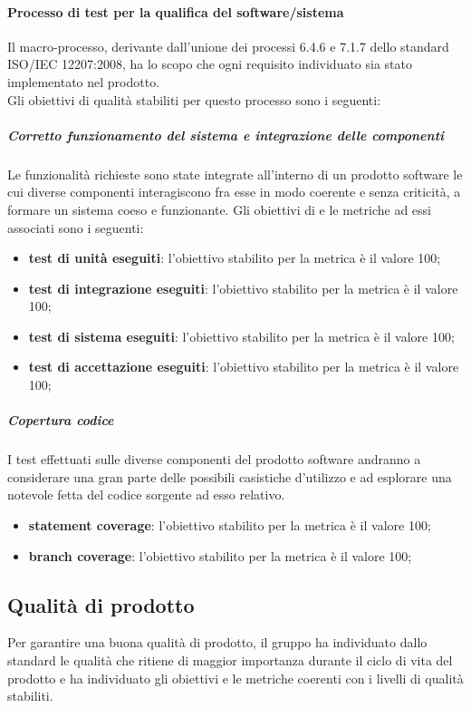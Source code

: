 			\paragraph{Processo di test per la qualifica del software/sistema}
			Il macro-processo, derivante dall'unione dei processi 6.4.6 e 7.1.7 dello standard ISO/IEC 12207:2008, ha lo scopo che ogni requisito individuato sia stato implementato nel prodotto.
			\\Gli obiettivi di qualità stabiliti per questo processo sono i seguenti:
				\subparagraph{Corretto funzionamento del sistema e integrazione delle componenti}
				Le funzionalità richieste sono state integrate all'interno di un prodotto software le cui diverse componenti interagiscono fra esse in modo coerente e senza criticità, a formare un sistema coeso e funzionante.
				Gli obiettivi di e le metriche ad essi associati sono i seguenti:
		 		\begin{itemize}
					\item \textbf{test di unità eseguiti}: l'obiettivo stabilito per la metrica è il valore 100;
					\item \textbf{test di integrazione eseguiti}: l'obiettivo stabilito per la metrica è il valore 100;
					\item \textbf{test di sistema eseguiti}: l'obiettivo stabilito per la metrica è il valore 100;
					\item \textbf{test di accettazione eseguiti}: l'obiettivo stabilito per la metrica è il valore 100;
				\end{itemize}
				
				\subparagraph{Copertura codice}
				I test effettuati sulle diverse componenti del prodotto software andranno a considerare una gran parte delle possibili casistiche d'utilizzo e ad esplorare una notevole fetta del codice sorgente ad esso relativo.
				\begin{itemize}
					\item \textbf{statement coverage}: l'obiettivo stabilito per la metrica è il valore 100;
					\item \textbf{branch coverage}: l'obiettivo stabilito per la metrica è il valore 100;
				\end{itemize}
	
	\subsection{Qualità di prodotto}
	Per garantire una buona qualità di prodotto, il gruppo \hx{} ha individuato dallo standard  le qualità che ritiene di maggior importanza durante il ciclo di vita del prodotto e ha individuato gli obiettivi e le metriche coerenti con i livelli di qualità stabiliti.
